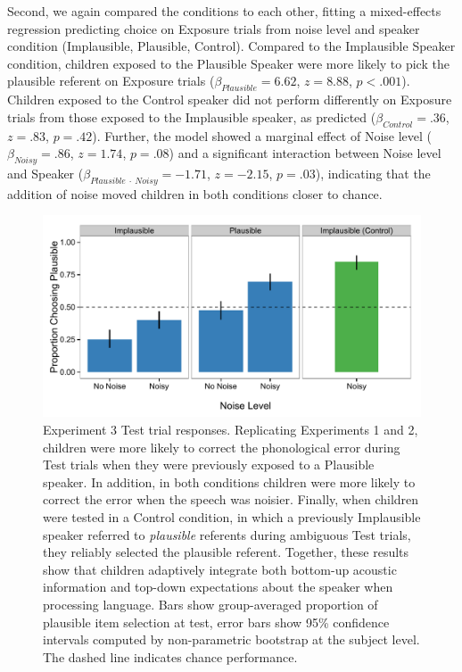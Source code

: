 \documentclass[man,floatsintext]{apa6}
\begin{document}
Second, we again compared the conditions to each other, fitting a mixed-effects regression predicting choice on Exposure trials from noise level and speaker condition (Implausible, Plausible, Control). Compared to the Implausible Speaker condition, children exposed to the Plausible Speaker were more likely to pick the plausible referent on Exposure trials ($\beta_{Plausible} = 6.62$, $z = 8.88$, $p <.001$). Children exposed to the Control speaker did not perform differently on Exposure trials from those exposed to the Implausible speaker, as predicted ($\beta_{Control} = .36$,  $z = .83$, $p = .42$). Further, the model showed a marginal effect of Noise level ($\beta_{Noisy} = .86$,  $z = 1.74$, $p = .08$) and a significant interaction between Noise level and Speaker ($\beta_{Plausible \: \cdot \: Noisy} = -1.71$, $z= -2.15$, $p = .03$), indicating that the addition of noise moved children in both conditions closer to chance.

\begin{figure}[tb]
     \centering
     \includegraphics[width=5in]{figures/exp3_results.pdf}
    \caption{Experiment 3 Test trial responses. Replicating Experiments 1 and 2, children were more likely to correct the phonological error during Test trials when they were previously exposed to a Plausible speaker. In addition, in both conditions children were more likely to correct the error when the speech was noisier. Finally, when children were tested in a Control condition, in which a previously Implausible speaker referred to \emph{plausible} referents during ambiguous Test trials, they reliably selected the plausible referent. Together, these results show that children adaptively integrate both bottom-up acoustic information and top-down expectations about the speaker when processing language. Bars show group-averaged proportion of plausible item selection at test, error bars show 95\% confidence intervals computed by non-parametric bootstrap at the subject level. The dashed line indicates chance performance.}%
   \label{fig:exp3_results}
\end{figure}
\end{document}
